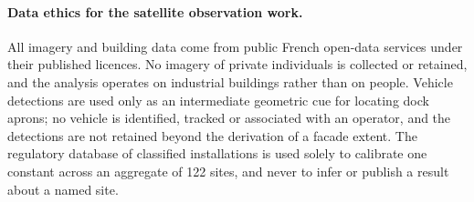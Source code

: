 \paragraph{Data ethics for the satellite observation work.} All imagery and building data come
from public French open-data services under their published licences. No imagery of private
individuals is collected or retained, and the analysis operates on industrial buildings
rather than on people. Vehicle detections are used only as an intermediate geometric cue for
locating dock aprons; no vehicle is identified, tracked or associated with an operator, and
the detections are not retained beyond the derivation of a facade extent. The regulatory
database of classified installations is used solely to calibrate one constant across an
aggregate of 122 sites, and never to infer or publish a result about a named site.
